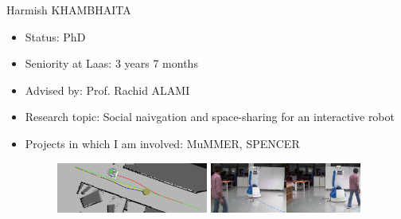 \documentclass{beamer}
\begin{document}
\begin{frame}{Harmish KHAMBHAITA}
  \begin{itemize}
  \item Status: PhD
  \item Seniority at Laas: 3 years 7 months
  \item Advised by: Prof. Rachid ALAMI
  \item Research topic: Social naivgation and space-sharing for an interactive robot
  \item Projects in which I am involved: MuMMER, SPENCER
    
  \begin{figure}[ht]
    \includegraphics[width=0.47\textwidth]{cooperative.png}
    \thinspace
    \includegraphics[width=0.47\textwidth]{legibility.png}
  \end{figure}
\end{itemize}
\end{frame}
\end{document}
